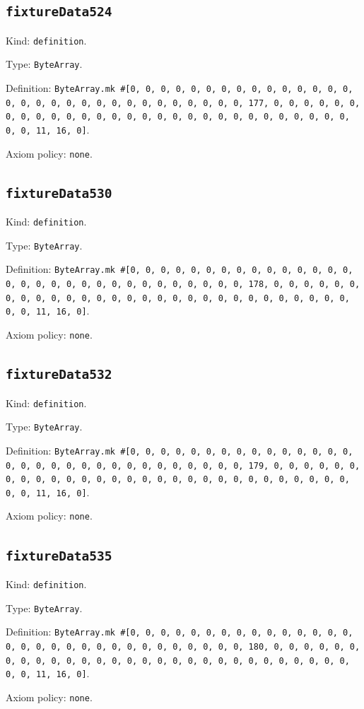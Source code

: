 \documentclass[11pt]{article}
\begin{document}
\subsection*{\texttt{fixtureData524}}
\noindent Kind: \texttt{definition}.\par
\noindent Type: \texttt{ByteArray}.\par
\noindent Definition: \texttt{ByteArray.mk \#[0, 0, 0, 0, 0, 0, 0, 0, 0, 0, 0, 0, 0, 0, 0, 0, 0, 0, 0, 0, 0, 0, 0, 0, 0, 0, 0, 0, 0, 0, 0, 177, 0, 0, 0, 0, 0, 0, 0, 0, 0, 0, 0, 0, 0, 0, 0, 0, 0, 0, 0, 0, 0, 0, 0, 0, 0, 0, 0, 0, 0, 0, 0, 11, 16, 0]}.\par
\noindent Axiom policy: \texttt{none}.\par
\subsection*{\texttt{fixtureData530}}
\noindent Kind: \texttt{definition}.\par
\noindent Type: \texttt{ByteArray}.\par
\noindent Definition: \texttt{ByteArray.mk \#[0, 0, 0, 0, 0, 0, 0, 0, 0, 0, 0, 0, 0, 0, 0, 0, 0, 0, 0, 0, 0, 0, 0, 0, 0, 0, 0, 0, 0, 0, 0, 178, 0, 0, 0, 0, 0, 0, 0, 0, 0, 0, 0, 0, 0, 0, 0, 0, 0, 0, 0, 0, 0, 0, 0, 0, 0, 0, 0, 0, 0, 0, 0, 11, 16, 0]}.\par
\noindent Axiom policy: \texttt{none}.\par
\subsection*{\texttt{fixtureData532}}
\noindent Kind: \texttt{definition}.\par
\noindent Type: \texttt{ByteArray}.\par
\noindent Definition: \texttt{ByteArray.mk \#[0, 0, 0, 0, 0, 0, 0, 0, 0, 0, 0, 0, 0, 0, 0, 0, 0, 0, 0, 0, 0, 0, 0, 0, 0, 0, 0, 0, 0, 0, 0, 179, 0, 0, 0, 0, 0, 0, 0, 0, 0, 0, 0, 0, 0, 0, 0, 0, 0, 0, 0, 0, 0, 0, 0, 0, 0, 0, 0, 0, 0, 0, 0, 11, 16, 0]}.\par
\noindent Axiom policy: \texttt{none}.\par
\subsection*{\texttt{fixtureData535}}
\noindent Kind: \texttt{definition}.\par
\noindent Type: \texttt{ByteArray}.\par
\noindent Definition: \texttt{ByteArray.mk \#[0, 0, 0, 0, 0, 0, 0, 0, 0, 0, 0, 0, 0, 0, 0, 0, 0, 0, 0, 0, 0, 0, 0, 0, 0, 0, 0, 0, 0, 0, 0, 180, 0, 0, 0, 0, 0, 0, 0, 0, 0, 0, 0, 0, 0, 0, 0, 0, 0, 0, 0, 0, 0, 0, 0, 0, 0, 0, 0, 0, 0, 0, 0, 11, 16, 0]}.\par
\noindent Axiom policy: \texttt{none}.\par
\end{document}
